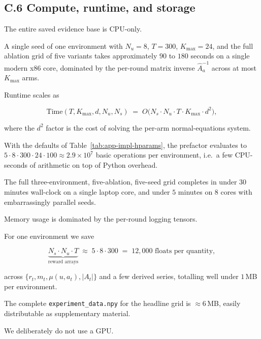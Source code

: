 \documentclass{article} %
\begin{document}
\subsection{C.6 Compute, runtime, and storage}

\label{app:impl-compute}

The entire saved evidence base is CPU-only.

A single seed of one environment with $N_u = 8$, $T = 300$, $K_{\max} = 24$, and the full ablation grid of five variants takes approximately $90$ to $180$ seconds on a single modern x86 core, dominated by the per-round matrix inverse $\widehat{A}_a^{-1}$ across at most $K_{\max}$ arms.

Runtime scales as

\begin{equation}
\label{eq:app-impl-runtime}
\mathrm{Time}(T, K_{\max}, d, N_u, N_s) \;=\; O\big(N_s \cdot N_u \cdot T \cdot K_{\max} \cdot d^2\big),
\end{equation}

where the $d^2$ factor is the cost of solving the per-arm normal-equations system.

With the defaults of Table~\ref{tab:app-impl-hparams}, the prefactor evaluates to $5 \cdot 8 \cdot 300 \cdot 24 \cdot 100 \approx 2.9 \times 10^7$ basic operations per environment, i.e.\ a few CPU-seconds of arithmetic on top of Python overhead.

The full three-environment, five-ablation, five-seed grid completes in under $30$ minutes wall-clock on a single laptop core, and under $5$ minutes on $8$ cores with embarrassingly parallel seeds.

Memory usage is dominated by the per-round logging tensors.

For one environment we save

\begin{equation}
\label{eq:app-impl-storage}
\underbrace{N_s \cdot N_u \cdot T}_{\text{reward arrays}} \;\approx\; 5 \cdot 8 \cdot 300 \;=\; 12{,}000 \text{ floats per quantity},
\end{equation}

across $\{r_t, m_t, \mu(u,a_t), |A_t|\}$ and a few derived series, totalling well under $1$\,MB per environment.

The complete \texttt{experiment\_data.npy} for the headline grid is $\approx 6$\,MB, easily distributable as supplementary material.

We deliberately do not use a GPU.
\end{document}
